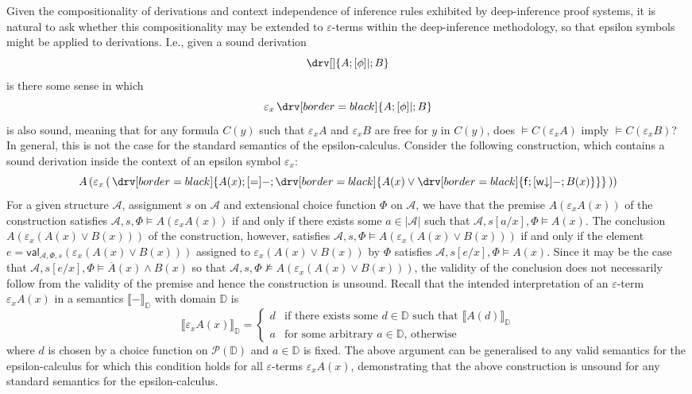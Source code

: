 \documentclass[10pt]{article}
\theoremstyle{definition}\newtheorem{remark}[theorem]{Remark}
\theoremstyle{definition}\newtheorem{example}[theorem]{Example}
\theoremstyle{definition}\newtheorem{definition}[theorem]{Definition}
\newcommand{\wDown}{{\mathsf{w\mathord\downarrow}}}
\newcommand{\falseUnit}{\mathsf{f}}
\begin{document}
	Given the compositionality of derivations and context independence of inference rules exhibited by deep-inference proof systems, it is natural to ask whether this compositionality may be extended to $\varepsilon$-terms within the deep-inference methodology, so that epsilon symbols might be applied to derivations. I.e., given a sound derivation
	\[
		\drv[] {A ; [\phi]| ; B}
	\]
	is there some sense in which
	\[
	\varepsilon_x \, \drv[border=black] {
		A ; [\phi]| ; B
	}
	\]
	is also sound, meaning that for any formula $C(y)$ such that $\varepsilon_x A$ and $\varepsilon_x B$ are free for $y$ in $C(y)$, does $\models C(\varepsilon_x A)$ imply $\models C(\varepsilon_x B)$? In general, this is not the case for the standard semantics of the epsilon-calculus. Consider the following construction, which contains a sound derivation inside the context of an epsilon symbol $\varepsilon_x$:
	\[
	A \left(\varepsilon_x \left( \, \drv[border=black] {
		A(x) ; [=]- ; \drv[border=black] {
			A(x) \lor \drv[border=black] {
				\falseUnit ; [\wDown]- ; B(x)
			}
		}
	} \, \right)\right)
	\]
	For a given structure $\mathcal{A}$, assignment $s$ on $\mathcal{A}$ and extensional choice function $\Phi$ on $\mathcal{A}$, we have that the premise $A(\varepsilon_x A(x))$ of the construction satisfies $\mathcal{A}, s, \Phi \models A(\varepsilon_x A(x))$ if and only if there exists some $a \in | \mathcal{A} |$ such that $\mathcal{A}, s[a / x], \Phi \models A(x)$. The conclusion $A(\varepsilon_x (A(x) \lor B(x)))$ of the construction, however, satisfies $\mathcal{A}, s, \Phi \models A(\varepsilon_x (A(x) \lor B(x)))$ if and only if the element $e = \mathsf{val}_{\mathcal{A}, \Phi, s}(\varepsilon_x (A(x) \lor B(x)))$ assigned to $\varepsilon_x (A(x) \lor B(x))$ by $\Phi$ satisfies $\mathcal{A}, s[e / x], \Phi \models A(x)$. Since it may be the case that $\mathcal{A}, s[e / x], \Phi \models \overline{A}(x) \land B(x)$ so that $\mathcal{A}, s, \Phi \nvDash A(\varepsilon_x (A(x) \lor B(x)))$, the validity of the conclusion does not necessarily follow from the validity of the premise and hence the construction is unsound. Recall that the intended interpretation of an $\varepsilon$-term $\varepsilon_x A(x)$ in a semantics $\llbracket - \rrbracket_\mathbb{D}$ with domain $\mathbb{D}$ is
	\[
		\llbracket \varepsilon_x A(x) \rrbracket_{\mathbb{D}} = \begin{cases}
			d & \text{if there exists some $d \in \mathbb{D}$ such that $\llbracket A(d) \rrbracket_\mathbb{D}$} \\
			a & \text{for some arbitrary $a \in \mathbb{D}$, otherwise}
		\end{cases}
	\]
	where $d$ is chosen by a choice function on $\mathcal{P}(\mathbb{D})$ and $a \in \mathbb{D}$ is fixed. The above argument can be generalised to any valid semantics for the epsilon-calculus for which this condition holds for all $\varepsilon$-terms $\varepsilon_x A(x)$, demonstrating that the above construction is unsound for any standard semantics for the epsilon-calculus.
	
\end{document}
